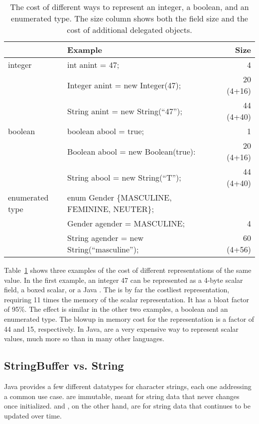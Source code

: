 \begin{table}
  \centering
\begin{tabular}{llr} \toprule \toprule
& Example & Size \\ \midrule \midrule
integer & int anint = 47; & 4 \\
\midrule
& Integer anint = new Integer(47); & 20 (4+16)  \\
\midrule
& String anint = new String(``47''); & 44 (4+40) \\
\midrule
\midrule
boolean & boolean abool = true; & 1\\
\midrule
& Boolean abool = new Boolean(true): & 20 (4+16) \\
\midrule
& String abool = new String(``T''); & 44 (4+40) \\
\midrule \midrule
enumerated type & enum Gender \{MASCULINE, FEMININE, NEUTER\}; &\\
& Gender agender = MASCULINE; & 4 \\
\midrule
& String agender = new String(``masculine''); & 60 (4+56) \\
\bottomrule \bottomrule
\end{tabular}
\caption{The cost of different ways to represent an integer, a boolean, and an
enumerated type. The size column shows both the field size and the cost of
additional delegated objects.}
\label{tab:scalar-data-sizes}
\end{table}

Table~\ref{tab:scalar-data-sizes} shows three examples of the cost of different
representations of the same value. In the first example, an integer 47 can be
represented as a 4-byte scalar field, a boxed scalar, or a Java . 
The  is by far the costliest representation, requiring 11 times
the memory of the scalar representation. It has a bloat factor of 95\%.
The effect is similar in the other two examples, a boolean and an enumerated
type. The blowup in memory cost for the  representation is a
factor of 44 and 15, respectively. In Java,  are a very expensive way to
represent scalar values, much more so than in many other languages.

\subsection{StringBuffer vs. String}
Java provides a few different datatypes for character strings, each one
addressing a common use case.  are immutable, meant for
string data that never changes once initialized.  and
, on the other hand, are for string data that continues to
be updated over time.

